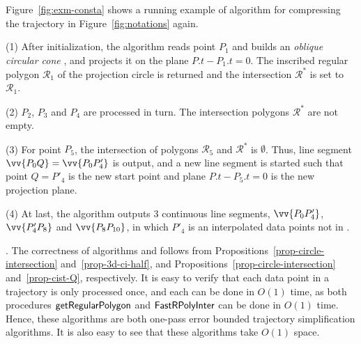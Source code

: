 \begin{example}
\label{exm-alg-conesta}
Figure~\ref{fig:exm-consta}  shows a running example of algorithm \cista for compressing the trajectory  in Figure~\ref{fig:notations} again.


\sstab (1) After initialization, the \cista algorithm reads point $P_1$ and builds an \emph{oblique circular cone} , and projects it on the plane $P.t-P_1.t=0$. The inscribed regular polygon $\mathcal{R}_1$ of the projection circle is returned and the intersection $\mathcal{R}^*$ is set to $\mathcal{R}_1$.

\sstab (2) $P_2$, $P_3$ and $P_4$ are processed in turn. The intersection polygons $\mathcal{R}^*$ are not empty.

\sstab (3) For point $P_5$, the intersection of polygons $\mathcal{R}_5$ and $\mathcal{R}^*$ is $\emptyset$. Thus, line segment $\vv{P_0Q} =\vv{P_0P'_4}$ is output, and a new line segment is started such that point $Q=P'_4$ is the new start point and plane $P.t-P_5.t=0$ is the new projection plane.

\sstab (4) At last, the algorithm outputs 3 continuous line segments, \ie $\vv{P_0P'_4}$, $\vv{P'_4P_8}$ and $\vv{P_8P_{10}}$, in which $P'_4$ is an interpolated data points not in . \eop
\end{example}




\vspace{.5ex}
.
%
The correctness of algorithms \cist and \cista follows from Propositions~\ref{prop-circle-intersection} and~\ref{prop-3d-ci-half}, and Propositions~\ref{prop-circle-intersection} and~\ref{prop-cist-Q}, respectively.
%
It is easy to verify that each data point in a trajectory is only processed once, and each can be done in $O(1)$ time,
as both procedures  ${\mathsf{getRegularPolygon}}$ and ${\mathsf{FastRPolyInter}}$ can be done in $O(1)$ time.
Hence, these algorithms are both one-pass error bounded trajectory simplification algorithms.
It is also easy to see that these algorithms take $O(1)$ space.




